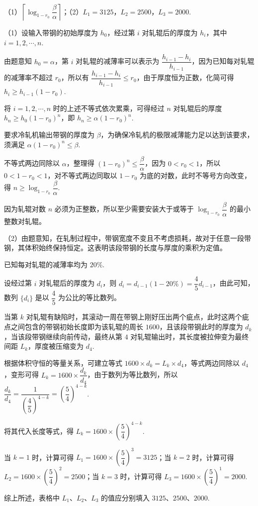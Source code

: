 \begin{answer}
（1）$\left\lceil \log_{1-r_0} \dfrac{\beta}{\alpha} \right\rceil$；（2）$L_1 = 3125$，$L_2 = 2500$，$L_3 = 2000$.
\end{answer}

\begin{solutions}
（1）设输入带钢的初始厚度为 $h_0$，经过第 $i$ 对轧辊后的厚度为 $h_i$，其中 $i = 1, 2, \cdots, n$.

由题意知 $h_0 = \alpha$，第 $i$ 对轧辊的减薄率可以表示为 $\dfrac{h_{i-1} - h_i}{h_{i-1}}$，因为已知每对轧辊的减薄率不超过 $r_0$，所以有 $\dfrac{h_{i-1} - h_i}{h_{i-1}} \leq r_0$，由于厚度恒为正数，化简可得 $h_i \geq h_{i-1}(1 - r_0)$.

将 $i = 1, 2, \cdots, n$ 时的上述不等式依次累乘，可得经过 $n$ 对轧辊后的厚度 $h_n \geq h_0 (1 - r_0)^n$，即 $h_n \geq \alpha (1 - r_0)^n$.

要求冷轧机输出带钢的厚度为 $\beta$，为确保冷轧机的极限减薄能力足以达到该要求，须满足 $\alpha (1 - r_0)^n \leq \beta$.

不等式两边同除以 $\alpha$，整理得 $(1 - r_0)^n \leq \dfrac{\beta}{\alpha}$，因为 $0 < r_0 < 1$，所以 $0 < 1 - r_0 < 1$，对不等式两边同取以 $1 - r_0$ 为底的对数，此时不等号方向改变，得 $n \geq \log_{1 - r_0} \dfrac{\beta}{\alpha}$.

因为轧辊对数 $n$ 必须为正整数，所以至少需要安装大于或等于 $\log_{1 - r_0} \dfrac{\beta}{\alpha}$ 的最小整数对轧辊。

（2）由题意知，在轧制过程中，带钢宽度不变且不考虑损耗，故对于任意一段带钢，其体积始终保持恒定。这表明该段带钢的长度与厚度的乘积为定值。

已知每对轧辊的减薄率均为 $20\%$.

设经过第 $i$ 对轧辊后的厚度为 $d_i$，则 $d_i = d_{i-1}(1 - 20\%) = \dfrac{4}{5} d_{i-1}$，由此可知，数列 $\{d_i\}$ 是以 $\dfrac{4}{5}$ 为公比的等比数列。

当第 $k$ 对轧辊有缺陷时，其滚动一周在带钢上刚好压出两个疵点，此时这两个疵点之间包含的带钢初始长度即为该轧辊的周长 $1600$，且该段带钢此时的厚度为 $d_k$，当该段带钢继续向前传动，最终从第 $4$ 对轧辊输出时，其长度被拉伸变为最终间距 $L_k$，厚度被压缩变为 $d_4$.

根据体积守恒的等量关系，可建立等式 $1600 \times d_k = L_k \times d_4$，等式两边同除以 $d_4$，变形可得 $L_k = 1600 \times \dfrac{d_k}{d_4}$，由于数列为等比数列，所以 $\dfrac{d_k}{d_4} = \dfrac{1}{\left(\dfrac{4}{5}\right)^{4 - k}} = \left(\dfrac{5}{4}\right)^{4 - k}$.

将其代入长度等式，得 $L_k = 1600 \times \left(\dfrac{5}{4}\right)^{4 - k}$.

当 $k = 1$ 时，计算可得 $L_1 = 1600 \times \left(\dfrac{5}{4}\right)^3 = 3125$；当 $k = 2$ 时，计算可得 $L_2 = 1600 \times \left(\dfrac{5}{4}\right)^2 = 2500$；当 $k = 3$ 时，计算可得 $L_3 = 1600 \times \left(\dfrac{5}{4}\right)^1 = 2000$.

综上所述，表格中 $L_1$、$L_2$、$L_3$ 的值应分别填入 $3125$、$2500$、$2000$.
\end{solutions}